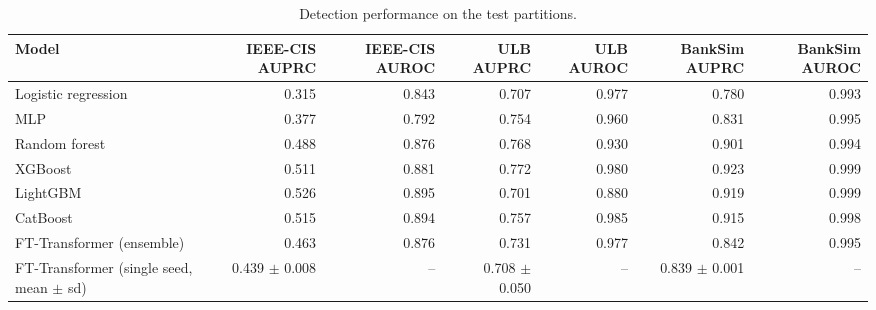 \begin{table}[t]
\centering
\caption{Detection performance on the test partitions.}
\label{tab:detection}
\begin{tabular}{lrrrrrr}
\toprule
Model & IEEE-CIS AUPRC & IEEE-CIS AUROC & ULB AUPRC & ULB AUROC & BankSim AUPRC & BankSim AUROC \\
\midrule
Logistic regression & 0.315 & 0.843 & 0.707 & 0.977 & 0.780 & 0.993 \\
MLP & 0.377 & 0.792 & 0.754 & 0.960 & 0.831 & 0.995 \\
Random forest & 0.488 & 0.876 & 0.768 & 0.930 & 0.901 & 0.994 \\
XGBoost & 0.511 & 0.881 & 0.772 & 0.980 & 0.923 & 0.999 \\
LightGBM & 0.526 & 0.895 & 0.701 & 0.880 & 0.919 & 0.999 \\
CatBoost & 0.515 & 0.894 & 0.757 & 0.985 & 0.915 & 0.998 \\
FT-Transformer (ensemble) & 0.463 & 0.876 & 0.731 & 0.977 & 0.842 & 0.995 \\
FT-Transformer (single seed, mean $\pm$ sd) & 0.439 $\pm$ 0.008 & -- & 0.708 $\pm$ 0.050 & -- & 0.839 $\pm$ 0.001 & -- \\
\bottomrule
\end{tabular}
\end{table}
